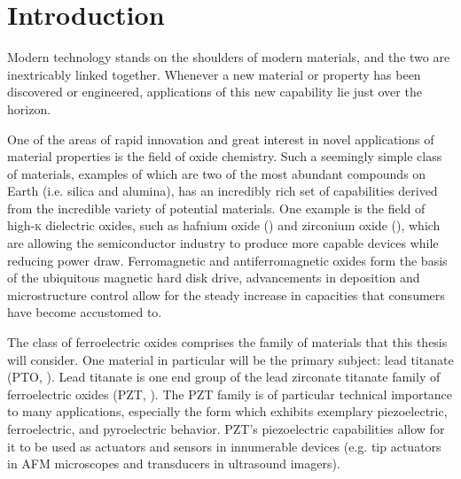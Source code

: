 {\fancyhead{}
\fancyfoot{}\mbox{}
}
\cleardoublepage
\addtocounter{page}{-2}
\fancyfoot{}


\fancyhead[LE,RO]{\bfseries\thepage}    %
                                        
\fancyhead[RE]{\bfseries\leftmark}    %
\fancyhead[LO]{\bfseries\rightmark}     %
\renewcommand{\headrulewidth}{0.3pt}
\chapter{Introduction}
\label{ch:Intro}
\thispagestyle{empty}



Modern technology stands on the shoulders of modern materials, and the two are inextricably linked together. Whenever a new material or property has been discovered or engineered, applications of this new capability lie just over the horizon. 

One of the areas of rapid innovation and great interest in novel applications of material properties is the field of oxide chemistry. Such a seemingly simple class of materials, examples of which are two of the most abundant compounds on Earth (i.e. silica and alumina), has an incredibly rich set of capabilities derived from the incredible variety of potential materials. One example is the field of high-\textsc{k} dielectric oxides, such as hafnium oxide () and zirconium oxide (),\cite{chen_atomic_2007,fischer_batch_2008} which are allowing the semiconductor industry to produce more capable devices while reducing power draw. Ferromagnetic and antiferromagnetic oxides form the basis of the ubiquitous magnetic hard disk drive, advancements in deposition and microstructure control allow for the steady increase in capacities that consumers have become accustomed to.\cite{scheffe_atomic_2009}

The class of ferroelectric oxides comprises the family of materials that this thesis will consider. One material in particular will be the primary subject: lead titanate (PTO, \PTO{}).\cite{harjuoja_2006,lee_effects_2009} Lead titanate is one end group of the lead zirconate titanate family of ferroelectric oxides (PZT, ).\cite{Muralt_2000} The PZT family is of particular technical importance to many applications, especially the  form which exhibits exemplary piezoelectric, ferroelectric, and pyroelectric behavior. PZT's piezoelectric capabilities allow for it to be used as actuators and sensors in innumerable devices (e.g. tip actuators in AFM microscopes and transducers in ultrasound imagers). 

